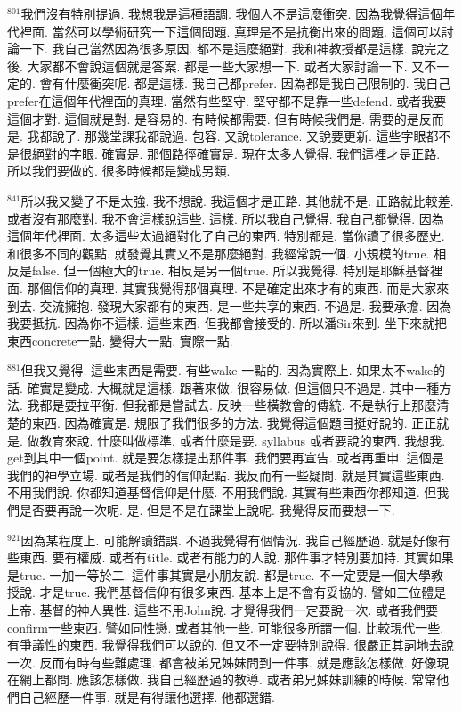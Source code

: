 \documentclass{book}
\begin{document}
$^{801}$我們沒有特別提過.
我想我是這種語調.
我個人不是這麼衝突.
因為我覺得這個年代裡面.
當然可以學術研究一下這個問題.
真理是不是抗衡出來的問題.
這個可以討論一下.
我自己當然因為很多原因.
都不是這麼絕對.
我和神教授都是這樣.
說完之後.
大家都不會說這個就是答案.
都是一些大家想一下.
或者大家討論一下.
又不一定的.
會有什麼衝突呢.
都是這樣.
我自己都prefer.
因為都是我自己限制的.
我自己prefer在這個年代裡面的真理.
當然有些堅守.
堅守都不是靠一些defend.
或者我要這個才對.
這個就是對.
是容易的.
有時候都需要.
但有時候我們是.
需要的是反而是.
我都說了.
那幾堂課我都說過.
包容.
又說tolerance.
又說要更新.
這些字眼都不是很絕對的字眼.
確實是.
那個路徑確實是.
現在太多人覺得.
我們這裡才是正路.
所以我們要做的.
很多時候都是變成另類.

$^{841}$所以我又變了不是太強.
我不想說.
我這個才是正路.
其他就不是.
正路就比較差.
或者沒有那麼對.
我不會這樣說這些.
這樣.
所以我自己覺得.
我自己都覺得.
因為這個年代裡面.
太多這些太過絕對化了自己的東西.
特別都是.
當你讀了很多歷史.
和很多不同的觀點.
就發覺其實又不是那麼絕對.
我經常說一個.
小規模的true.
相反是false.
但一個極大的true.
相反是另一個true.
所以我覺得.
特別是耶穌基督裡面.
那個信仰的真理.
其實我覺得那個真理.
不是確定出來才有的東西.
而是大家來到去.
交流擁抱.
發現大家都有的東西.
是一些共享的東西.
不過是.
我要承擔.
因為我要抵抗.
因為你不這樣.
這些東西.
但我都會接受的.
所以潘Sir來到.
坐下來就把東西concrete一點.
變得大一點.
實際一點.

$^{881}$但我又覺得.
這些東西是需要.
有些wake 一點的.
因為實際上.
如果太不wake的話.
確實是變成.
大概就是這樣.
跟著來做.
很容易做.
但這個只不過是.
其中一種方法.
我都是要拉平衡.
但我都是嘗試去.
反映一些橫教會的傳統.
不是執行上那麼清楚的東西.
因為確實是.
規限了我們很多的方法.
我覺得這個題目挺好說的.
正正就是.
做教育來說.
什麼叫做標準.
或者什麼是要.
syllabus 或者要說的東西.
我想我.
get到其中一個point.
就是要怎樣提出那件事.
我們要再宣告.
或者再重申.
這個是我們的神學立場.
或者是我們的信仰起點.
我反而有一些疑問.
就是其實這些東西.
不用我們說.
你都知道基督信仰是什麼.
不用我們說.
其實有些東西你都知道.
但我們是否要再說一次呢.
是.
但是不是在課堂上說呢.
我覺得反而要想一下.

$^{921}$因為某程度上.
可能解讀錯誤.
不過我覺得有個情況.
我自己經歷過.
就是好像有些東西.
要有權威.
或者有title.
或者有能力的人說.
那件事才特別要加持.
其實如果是true.
一加一等於二.
這件事其實是小朋友說.
都是true.
不一定要是一個大學教授說.
才是true.
我們基督信仰有很多東西.
基本上是不會有妥協的.
譬如三位體是上帝.
基督的神人異性.
這些不用John說.
才覺得我們一定要說一次.
或者我們要confirm一些東西.
譬如同性戀.
或者其他一些.
可能很多所謂一個.
比較現代一些.
有爭議性的東西.
我覺得我們可以說的.
但又不一定要特別說得.
很嚴正其詞地去說一次.
反而有時有些難處理.
都會被弟兄姊妹問到一件事.
就是應該怎樣做.
好像現在網上都問.
應該怎樣做.
我自己經歷過的教導.
或者弟兄姊妹訓練的時候.
常常他們自己經歷一件事.
就是有得讓他選擇.
他都選錯.
\end{document}
